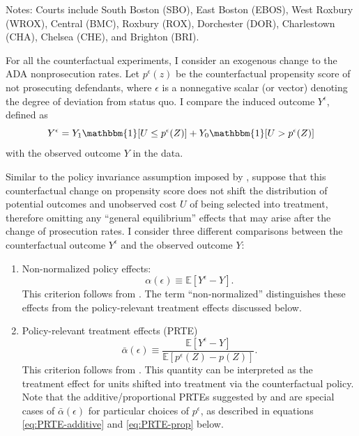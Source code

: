 \documentclass[11pt]{article}
\theoremstyle{definition}
\newcommand{\Exp}{\ensuremath{\mathbb{E}}} %
\newcommand{\0}{\ensuremath{\mathbf{0}}}
\newcommand{\indicator}{\ensuremath{\mathbbm{1}}}
\begin{document}
\begin{bibunit}
\begin{table}[htbp]
    \begin{tablenotes}
        \footnotesize\raggedright
        Notes: Courts include South Boston (SBO), East Boston (EBOS), West Roxbury (WROX), Central (BMC), Roxbury (ROX), Dorchester (DOR), Charlestown (CHA), Chelsea (CHE), and Brighton (BRI).
    \end{tablenotes}
  \label{tab:sum_stat}%
\end{table}%

For all the counterfactual experiments, I consider an exogenous change to the ADA nonprosecution rates. Let $p^\epsilon(z)$ be the counterfactual propensity score of not prosecuting defendants, where $\epsilon$ is a nonnegative scalar (or vector) denoting the degree of deviation from status quo. I compare the induced outcome $Y^\epsilon$, defined as 
\[
		Y^{\epsilon} = Y_1 \indicator[U \leq p^{\epsilon}(Z)] + Y_0 \indicator[U > p^{\epsilon}(Z)]
\]
with the observed outcome $Y$ in the data.

Similar to the policy invariance assumption imposed by \cite{heckman/vytlacil:2005}, suppose that this counterfactual change on propensity score does not shift the distribution of potential outcomes and unobserved cost $U$ of being selected into treatment, therefore omitting any ``general equilibrium'' effects that may arise after the change of prosecution rates. I consider three different comparisons between the counterfactual outcome $Y^\epsilon$ and the observed outcome $Y$:
\begin{enumerate}
\item Non-normalized policy effects:
\begin{equation}
\label{eq:policy_effects}
	\alpha(\epsilon) \equiv \Exp[Y^\epsilon - Y].
\end{equation} 
This criterion follows from \cite{heckman/vytlacil:2001}. The term ``non-normalized'' distinguishes these effects from the policy-relevant treatment effects discussed below.

\item Policy-relevant treatment effects (PRTE)
\begin{equation}
\label{eq:norm_policy_effects}
	 \bar{\alpha}(\epsilon) \equiv \frac{ \Exp[Y^\epsilon - Y]}{\Exp[p^{\epsilon}(Z) - p(Z)]}.
\end{equation}
This criterion follows from \cite{heckman/vytlacil:2005}. This quantity can be interpreted as the treatment effect for units shifted into treatment via the counterfactual policy. Note that the additive/proportional PRTEs suggested by \cite{carneiro/heckman/vytlacil:2010,carneiro/heckman/vytlacil:2011} and \cite{mogstad/torgovitsky:2018} are special cases of $\bar{\alpha}(\epsilon)$ for particular choices of $p^{\epsilon}$, as described in equations \eqref{eq:PRTE-additive} and \eqref{eq:PRTE-prop} below. 


\end{enumerate}
\end{bibunit}
\end{document}
